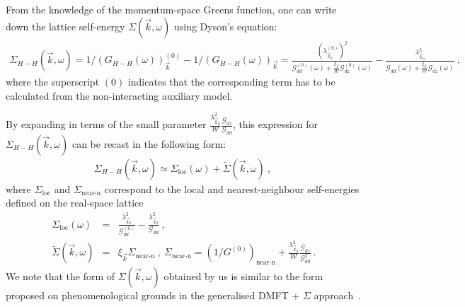 \documentclass[prb]{revtex4-2}
\begin{document}
From the knowledge of the momentum-space Greens function, one can write down the lattice self-energy \(\Sigma(\vec k,\omega)\) using Dyson's equation:
\begin{equation}\begin{aligned}
	\label{selfenergy1}
	\Sigma_{H-H}(\vec k,\omega) = 1/\left(G_{H-H}(\omega)\right)_{\vec k}^{(0)} - 1/\left(G_{H-H}(\omega)\right)_{\vec k} = \frac{\left(\lambda_{\vec k_0}^{(0)}\right)^2}{\mathcal{G}^{(0)}_{dd}(\omega) + \frac{\xi_{\vec k}}{\mathcal{W}}\mathcal{G}^{(0)}_{dz}(\omega)} - \frac{\lambda_{\vec k_0}^2}{\mathcal{G}_{dd}(\omega) + \frac{\xi_{\vec k}}{\mathcal{W}}\mathcal{G}_{dz}(\omega)}~,
\end{aligned}\end{equation}
where the superscript \((0)\) indicates that the corresponding term has to be calculated from the non-interacting auxiliary model. 

By expanding in terms of the small parameter $\frac{\lambda_{\vec k_0}^2}{\mathcal{W}}\frac{\mathcal{G}_{dz}}{\mathcal{G}_{dd}}$, this expression for $\Sigma_{H-H}(\vec k,\omega)$ can be recast in the following form:
\begin{equation}\begin{aligned}
	\Sigma_{H-H}(\vec k, \omega) \simeq \Sigma_\text{loc}(\omega) + \tilde{\Sigma}(\vec k, \omega)~,~\label{selfenergy2}
\end{aligned}\end{equation}
where $\Sigma_\text{loc}$ and $\Sigma_\text{near-n}$ correspond to the local and nearest-neighbour self-energies defined on the real-space lattice 
\begin{eqnarray}
\Sigma_\text{loc}(\omega) &=& \frac{\lambda_{\vec k_0}^2}{\mathcal{G}_{dd}^{(0)}} - \frac{\lambda_{\vec k_0}^2}{\mathcal{G}_{dd}}~,\\ 
\tilde{\Sigma}(\vec k, \omega)&=&\xi_{\vec k}\Sigma_\text{near-n}~,~\Sigma_\text{near-n} = \left(1/G^{(0)}\right)_\text{near-n} + \frac{\lambda_{\vec k_0}^2}{\mathcal{W}}\frac{\mathcal{G}_{dz}}{\mathcal{G}_{dd}^2}~.
\end{eqnarray}
We note that the form of $\Sigma(\vec k, \omega)$ obtained by us is similar to the form proposed on phenomenological grounds in the generalised DMFT + $\Sigma$ approach~\cite{sadovskii2012}.
\end{document}
